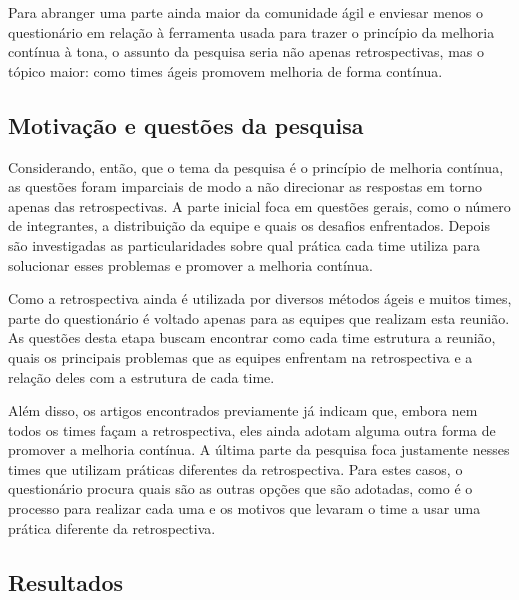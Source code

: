 Para abranger uma parte ainda maior da comunidade ágil e enviesar menos o questionário em relação à ferramenta usada para trazer o princípio da melhoria contínua à tona, o assunto da pesquisa seria não apenas retrospectivas, mas o tópico maior: como times ágeis promovem melhoria de forma contínua.


\subsection{Motivação e questões da pesquisa}

Considerando, então, que o tema da pesquisa é o princípio de melhoria contínua, as questões foram imparciais de modo a não direcionar as respostas em torno apenas das retrospectivas. A parte inicial foca em questões gerais, como o número de integrantes, a distribuição da equipe e quais os desafios enfrentados. Depois são investigadas as particularidades sobre qual prática cada time utiliza para solucionar esses problemas e promover a melhoria contínua. 

Como a retrospectiva ainda é utilizada por diversos métodos ágeis e muitos times, parte do questionário é voltado apenas para as equipes que realizam esta reunião. As questões desta etapa buscam encontrar como cada time estrutura a reunião, quais os principais problemas que as equipes enfrentam na retrospectiva e a relação deles com a estrutura de cada time. 

Além disso, os artigos encontrados previamente já indicam que, embora nem todos os times façam a retrospectiva, eles ainda adotam alguma outra forma de promover a melhoria contínua. A última parte da pesquisa foca justamente nesses times que utilizam práticas diferentes da retrospectiva. Para estes casos, o questionário procura quais são as outras opções que são adotadas, como é o processo para realizar cada uma e os motivos que levaram o time a usar uma prática diferente da retrospectiva.

\subsection{Resultados}

